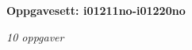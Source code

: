 \centerline{\bf Oppgavesett: i01211no-i01220no}
\vskip 10pt
\centerline{\it 10 oppgaver}\vskip 10pt
\vskip 10pt
